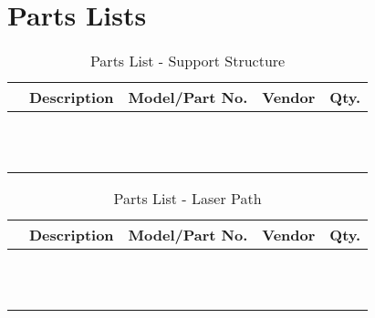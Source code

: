 \section{Parts Lists} \label{appx:parts_lists}

\begin{table}[htbp]
    \renewcommand{\arraystretch}{1.25}
    \caption{Parts List - Support Structure}
    \begin{center}
        \begin{tabular}{ l l l l l }
        \toprule[2pt]
        \textbf{} & \textbf{Description} & \textbf{Model/Part No.}  & \textbf{Vendor} & \textbf{Qty.} \\
        \midrule[0.75pt]
        &  &  &  &  \\
        &  &  &  &  \\
        &  &  &  &  \\
        &  &  &  &  \\
        &  &  &  &  \\
        &  &  &  &  \\
        &  &  &  &  \\
        &  &  &  &  \\
        &  &  &  &  \\
        &  &  &  &  \\
        &  &  &  &  \\
        \bottomrule[2pt]
        \end{tabular}
        \label{tab:parts_list_support}
    \end{center}
\end{table}

\begin{table}[htbp]
    \renewcommand{\arraystretch}{1.25}
    \caption{Parts List - Laser Path}
    \begin{center}
        \begin{tabular}{ l l l l l }
        \toprule[2pt]
        \textbf{} & \textbf{Description} & \textbf{Model/Part No.}  & \textbf{Vendor} & \textbf{Qty.} \\
        \midrule[0.75pt]
        &  &  &  &  \\
        &  &  &  &  \\
        &  &  &  &  \\
        &  &  &  &  \\
        &  &  &  &  \\
        &  &  &  &  \\
        &  &  &  &  \\
        &  &  &  &  \\
        &  &  &  &  \\
        &  &  &  &  \\
        &  &  &  &  \\
        \bottomrule[2pt]
        \end{tabular}
        \label{tab:parts_list_laser_path}
    \end{center}
\end{table}

